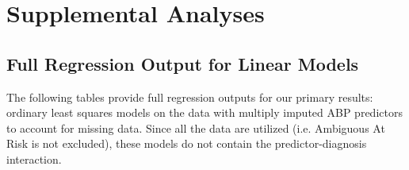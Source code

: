 \documentclass[10pt]{article}\usepackage[]{graphicx}\usepackage[]{color}
\begin{document}
\clearpage
\section{Supplemental Analyses}

\subsection{Full Regression Output for Linear Models}
\label{sec:fullOutput}

The following tables provide full regression outputs for our primary results: ordinary least squares models on the data with multiply imputed ABP predictors to account for missing data. Since all the data are utilized (i.e. Ambiguous At Risk is not excluded), these models do not contain the predictor-diagnosis interaction.
\end{document}
